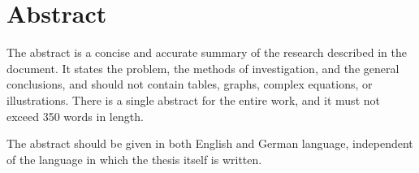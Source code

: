 %
%
%
%

\chapter*{Abstract}
\label{chap:abstract}

The abstract is a concise and accurate summary of the research described in the document. It states the problem, the methods of investigation, and the general conclusions, and should not contain tables, graphs, complex equations, or illustrations. There is a single abstract for the entire work, and it must not exceed 350 words in length.

The abstract should be given in both English and German language, independent of the language in which the thesis itself is written.

%

